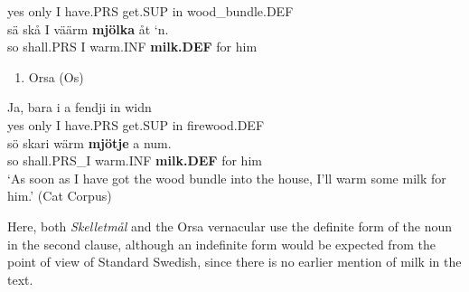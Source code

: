 yes  only  I  have.PRS  get.SUP  in  wood\_bundle.DEF\\ %


\ea\label{}
\gll sä  skå  I  väärm  \textbf{mjölka} åt  ‘n.\\


so  shall.PRS  I  warm.INF  \textbf{milk.DEF} for  him\\ %


\begin{enumerate} %
\item 
Orsa (Os)

\end{enumerate} %
\ea\label{}
\gll Ja,  bara  i  a  fendji  in  widn\\


yes  only  I  have.PRS  get.SUP  in  firewood.DEF\\ %


\ea\label{}
\gll sö  skari  wärm  \textbf{mjötje} a  num.\\


so  shall.PRS\_I  warm.INF  \textbf{milk.DEF} for  him\\ %


‘As soon as I have got the wood bundle into the house, I’ll warm some milk for him.’ (Cat Corpus)
\z


Here, both \textit{Skelletmål} and the Orsa vernacular use the definite form of the noun  in the second clause, although an indefinite form would be expected from the point of view of Standard Swedish, since there is no earlier mention of milk in the text. 

